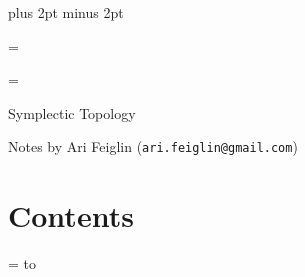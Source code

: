 


\parindent=0pt
\parskip=3pt plus 2pt minus 2pt

\footline={}


\headline={\pagedecor}

{\setboxshadow
\contentbox

    \centerline{Symplectic Topology}
    \smallskip
    \centerline{Notes by Ari Feiglin ({\tt ari.feiglin@gmail.com})}

\eppbox

\bigskip

\contentbox
    \section*{Contents}
    
    \tableofcontents
\eppbox

}

\vfill\break

\color{black}

\newif\ifpageodd
\pageoddtrue
\headline={%
    \hbox to \hsize{\color{black}%
        \ifpageodd\hfil{\it\currsubsection\quad\bf\folio}\global\pageoddfalse%
        \else{\bf\folio\quad\it\currsubsection}\hfil\global\pageoddtrue\fi%
    }%
}




\bye


